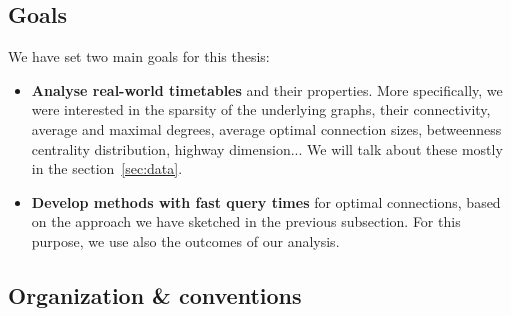 \subsection{Goals}
	
	\noindent We have set two main goals for this thesis:
	\begin{itemize}
		\item \textbf{Analyse real-world timetables} and their properties. More specifically, we were interested in the sparsity of the underlying graphs, their connectivity, average and maximal degrees, average optimal connection sizes, betweenness centrality distribution, highway dimension... We will talk about these mostly in the section~\ref{sec:data}. 
		\item \textbf{Develop methods with fast query times} for optimal connections, based on the approach we have sketched in the previous subsection. For this purpose, we use also the outcomes of our analysis.
	\end{itemize}
	
\subsection{Organization \& conventions}

	\noindent 